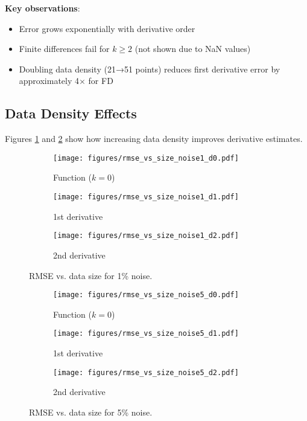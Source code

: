 \documentclass[11pt,a4paper]{article}
\begin{document}
\textbf{Key observations}:
\begin{itemize}
    \item Error grows exponentially with derivative order
    \item Finite differences fail for $k \geq 2$ (not shown due to NaN values)
    \item Doubling data density (21→51 points) reduces first derivative error by approximately 4$\times$ for FD
\end{itemize}

\subsection{Data Density Effects}

Figures \ref{fig:rmse_vs_size_noise1} and \ref{fig:rmse_vs_size_noise5} show how increasing data density improves derivative estimates.

\begin{figure}[H]
\centering
\begin{subfigure}{0.32\textwidth}
    \texttt{[image: figures/rmse\_vs\_size\_noise1\_d0.pdf]}
    \caption{Function ($k=0$)}
\end{subfigure}
\hfill
\begin{subfigure}{0.32\textwidth}
    \texttt{[image: figures/rmse\_vs\_size\_noise1\_d1.pdf]}
    \caption{1st derivative}
\end{subfigure}
\hfill
\begin{subfigure}{0.32\textwidth}
    \texttt{[image: figures/rmse\_vs\_size\_noise1\_d2.pdf]}
    \caption{2nd derivative}
\end{subfigure}
\caption{RMSE vs. data size for 1\% noise.}
\label{fig:rmse_vs_size_noise1}
\end{figure}

\begin{figure}[H]
\centering
\begin{subfigure}{0.32\textwidth}
    \texttt{[image: figures/rmse\_vs\_size\_noise5\_d0.pdf]}
    \caption{Function ($k=0$)}
\end{subfigure}
\hfill
\begin{subfigure}{0.32\textwidth}
    \texttt{[image: figures/rmse\_vs\_size\_noise5\_d1.pdf]}
    \caption{1st derivative}
\end{subfigure}
\hfill
\begin{subfigure}{0.32\textwidth}
    \texttt{[image: figures/rmse\_vs\_size\_noise5\_d2.pdf]}
    \caption{2nd derivative}
\end{subfigure}
\caption{RMSE vs. data size for 5\% noise.}
\label{fig:rmse_vs_size_noise5}
\end{figure}
\end{document}

